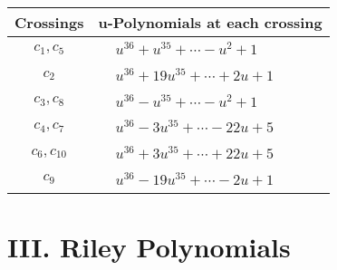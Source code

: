 \documentclass[1p]{elsarticle_modified}
\theoremstyle{definition}
\begin{document}
\begin{tabular}{m{50pt}|m{274pt}}
Crossings & \hspace{64pt}u-Polynomials at each crossing \\
\hline $$\begin{aligned}c_{1},c_{5}\end{aligned}$$&$\begin{aligned}
&u^{36}+u^{35}+\cdots- u^2+1
\end{aligned}$\\
\hline $$\begin{aligned}c_{2}\end{aligned}$$&$\begin{aligned}
&u^{36}+19 u^{35}+\cdots+2 u+1
\end{aligned}$\\
\hline $$\begin{aligned}c_{3},c_{8}\end{aligned}$$&$\begin{aligned}
&u^{36}- u^{35}+\cdots- u^2+1
\end{aligned}$\\
\hline $$\begin{aligned}c_{4},c_{7}\end{aligned}$$&$\begin{aligned}
&u^{36}-3 u^{35}+\cdots-22 u+5
\end{aligned}$\\
\hline $$\begin{aligned}c_{6},c_{10}\end{aligned}$$&$\begin{aligned}
&u^{36}+3 u^{35}+\cdots+22 u+5
\end{aligned}$\\
\hline $$\begin{aligned}c_{9}\end{aligned}$$&$\begin{aligned}
&u^{36}-19 u^{35}+\cdots-2 u+1
\end{aligned}$\\
\hline
\end{tabular}\newpage\renewcommand{\arraystretch}{1}
\centering \section*{ III. Riley Polynomials}
\end{document}
